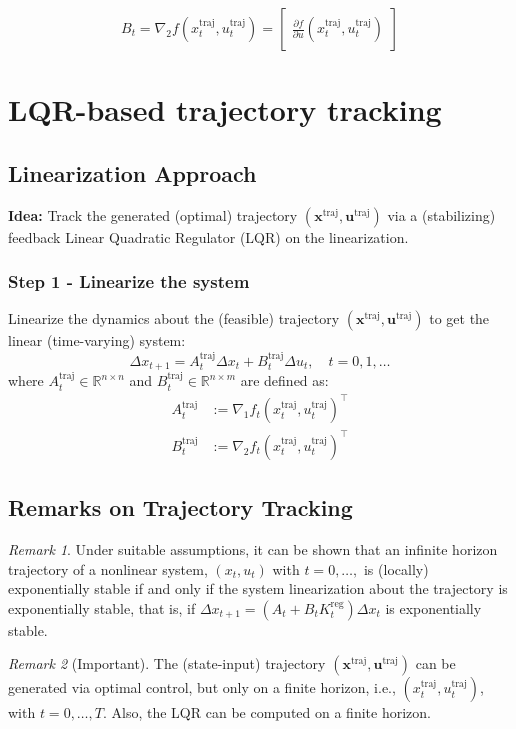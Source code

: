 \documentclass[openany]{book}
\theoremstyle{definition}
\theoremstyle{remark}
\newtheorem*{remark}{Remark}
\begin{document}
\[
B_t = \nabla_2f(x_t^{\text{traj}},u_t^{\text{traj}}) = \begin{bmatrix}
\frac{\partial f}{\partial u}(x_t^{\text{traj}},u_t^{\text{traj}})
\end{bmatrix}
\]

\section{LQR-based trajectory tracking}

\subsection{Linearization Approach}
\textbf{Idea:} Track the generated (optimal) trajectory $(\mathbf{x}^{\text{traj}}, \mathbf{u}^{\text{traj}})$ via a (stabilizing) feedback Linear Quadratic Regulator (LQR) on the linearization.

\subsubsection{Step 1 - Linearize the system}
Linearize the dynamics about the (feasible) trajectory $(\mathbf{x}^{\text{traj}}, \mathbf{u}^{\text{traj}})$ to get the linear (time-varying) system:
\[
    \Delta x_{t+1} = A_t^{\text{traj}}\Delta x_t + B_t^{\text{traj}}\Delta u_t, \quad t = 0,1,\ldots
\]
where $A_t^{\text{traj}} \in \mathbb{R}^{n \times n}$ and $B_t^{\text{traj}} \in \mathbb{R}^{n \times m}$ are defined as:
\begin{align*}
    A_t^{\text{traj}} &:= \nabla_1 f_t(x_t^{\text{traj}}, u_t^{\text{traj}})^\top \\
    B_t^{\text{traj}} &:= \nabla_2 f_t(x_t^{\text{traj}}, u_t^{\text{traj}})^\top
\end{align*}

\subsection{Remarks on Trajectory Tracking}
\begin{remark}
Under suitable assumptions, it can be shown that an infinite horizon trajectory of a nonlinear system, $(x_t, u_t)$ with $t = 0,\ldots,$ is (locally) exponentially stable if and only if the system linearization about the trajectory is exponentially stable, that is, if $\Delta x_{t+1} = (A_t + B_tK_t^{\text{reg}})\Delta x_t$ is exponentially stable.
\end{remark}

\begin{remark}[Important]
The (state-input) trajectory $(\mathbf{x}^{\text{traj}}, \mathbf{u}^{\text{traj}})$ can be generated via optimal control, but only on a finite horizon, i.e., $(x_t^{\text{traj}}, u_t^{\text{traj}})$, with $t = 0,\ldots,T$. Also, the LQR can be computed on a finite horizon.
\end{remark}
\end{document}
